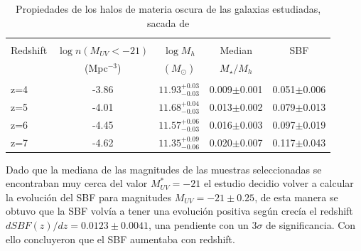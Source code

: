 \documentclass{article}
\begin{document}
\begin{table}[h]
\begin{center}
\begin{tabular}{lcccc}
\hline \hline\\
Redshift & $\log n(M_{UV}<-21)$ & $\log M_h$ & Median & SBF \\
	& (Mpc$^{-3}$)& $(M_\odot)$ &	$M_\star/M_h$	&	\\
\hline\\
z=4 & -3.86 & $11.93_{-0.03}^{+0.03}$ & 0.009$\pm$0.001 & 0.051$\pm$0.006\\
z=5 & -4.01 & $11.68_{-0.03}^{+0.04}$ & 0.013$\pm$0.002 & 0.079$\pm$0.013\\
z=6 & -4.45 & $11.57_{-0.03}^{+0.06}$ & 0.016$\pm$0.003 & 0.097$\pm$0.019\\
z=7 & -4.62 & $11.35_{-0.06}^{+0.09}$ & 0.020$\pm$0.007 & 0.117$\pm$0.043\\
\hline
\end{tabular}
\caption{\label{tab:finkelstein2} Propiedades de los halos de materia oscura de las galaxias estudiadas, sacada de \cite{finkelstein2015increasing}}
\end{center}
\end{table}

Dado que la mediana de las magnitudes de las muestras seleccionadas se encontraban muy cerca del valor $M_{UV}^*=-21$ el estudio decidio volver a calcular la evolución del SBF para magnitudes $M_{UV}=-21\pm 0.25$, de esta manera se obtuvo que la SBF volvía a tener una evolución positiva según crecía el redshift $d SBF(z)/dz=0.0123\pm 0.0041$, una pendiente con un $3\sigma$ de significancia. Con ello concluyeron que el SBF aumentaba con redshift.

\newpage





\end{document}
